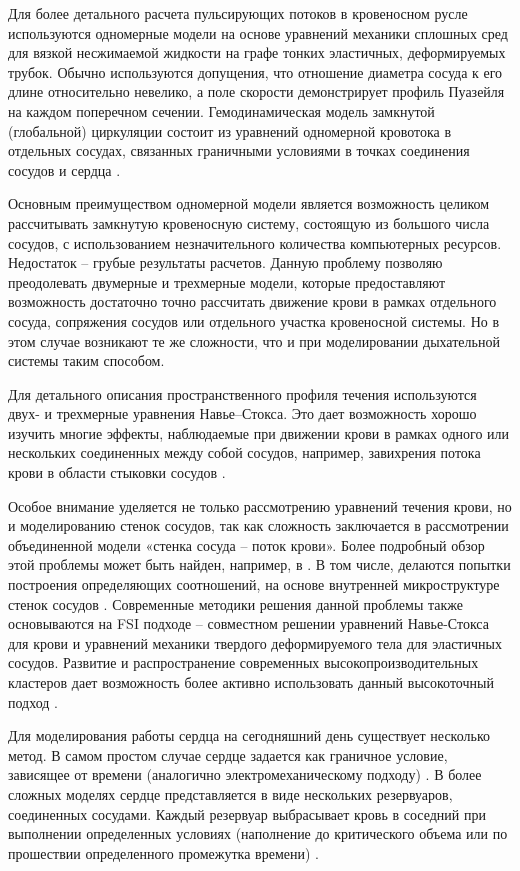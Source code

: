Для более детального расчета пульсирующих потоков в кровеносном русле используются одномерные модели на основе уравнений механики сплошных сред для вязкой несжимаемой жидкости на графе тонких эластичных, деформируемых трубок.  Обычно используются допущения, что отношение диаметра сосуда к его длине относительно невелико, а поле скорости демонстрирует профиль Пуазейля на каждом поперечном сечении. Гемодинамическая модель замкнутой (глобальной) циркуляции состоит из уравнений одномерной кровотока в отдельных сосудах, связанных граничными условиями в точках соединения сосудов и сердца \cite{Simakov2009,Kholodov2006,Vassilevski2011,Bessonov2016,Sherwin2003}.

Основным преимуществом одномерной модели является возможность целиком рассчитывать замкнутую кровеносную систему, состоящую из большого числа сосудов, с использованием незначительного количества компьютерных ресурсов. Недостаток – грубые результаты расчетов. Данную проблему позволяю преодолевать двумерные и трехмерные модели, которые предоставляют возможность достаточно точно рассчитать движение крови в рамках отдельного сосуда, сопряжения сосудов или отдельного участка кровеносной системы. Но в этом случае возникают те же сложности, что и при моделировании дыхательной системы таким способом. 

Для детального описания пространственного профиля течения используются двух- и трехмерные уравнения Навье–Стокса. Это дает возможность хорошо изучить многие эффекты, наблюдаемые при движении крови в рамках одного или нескольких соединенных между собой сосудов, например, завихрения потока крови в области стыковки сосудов \cite{Xiao2013,Yakhot2005}.

Особое внимание уделяется не только рассмотрению уравнений течения крови, но и моделированию стенок сосудов, так как сложность заключается в рассмотрении объединенной модели «стенка сосуда – поток крови». Более подробный обзор этой проблемы может быть найден, например, в \cite{Vito2003,Humphrey2003}. В том числе, делаются попытки построения определяющих соотношений, на основе внутренней микроструктуре стенок сосудов \cite{Chen2013}. Современные методики решения данной проблемы также основываются на FSI подходе – совместном решении уравнений Навье-Стокса для крови и уравнений механики твердого деформируемого тела для эластичных сосудов. Развитие и распространение современных высокопроизводительных кластеров дает возможность более активно использовать данный высокоточный подход \cite{Crosetto2011,Barker2010}.

Для моделирования работы сердца на сегодняшний день существует несколько метод. В самом простом случае сердце задается как граничное условие, зависящее от времени (аналогично электромеханическому подходу) \cite{Carlo2003}. В более сложных моделях сердце представляется в виде нескольких резервуаров, соединенных сосудами. Каждый резервуар выбрасывает кровь в соседний при выполнении определенных условиях (наполнение до критического объема или по прошествии определенного промежутка времени) \cite{kholodov2001}. 

